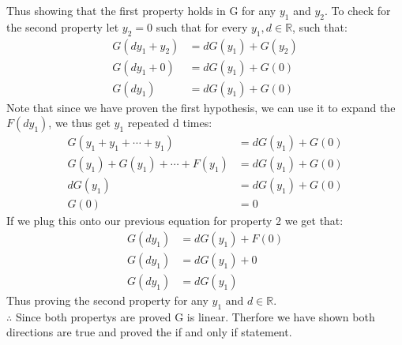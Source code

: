 \documentclass[11pt]{article}
\begin{document}
Thus showing that the first property holds in G for any $y_1$ and $y_2$. To check for the second property let $y_2 = 0$ such that for every $y_1, d \in \mathbb{R}$, such that:
\begin{align*}
G(dy_1 + y_2) &= dG(y_1) + G(y_2)\\
G(dy_1 + 0) &= dG(y_1) + G(0)\\
G(dy_1) &= dG(y_1) + G(0)
\end{align*}
Note that since we have proven the first hypothesis, we can use it to expand the $F(dy_1)$, we thus get $y_1$ repeated d times:
\begin{align*}
G(y_1 + y_1 + \cdots + y_1) &= dG(y_1) + G(0)\\
G(y_1) + G(y_1) + \cdots + F(y_1) &= dG(y_1) + G(0)\\
dG(y_1) &= dG(y_1) + G(0)\\
G(0) &= 0
\end{align*}
If we plug this onto our previous equation for property 2 we get that:
\begin{align*}
G(dy_1) &= dG(y_1) + F(0)\\
G(dy_1) &= dG(y_1) + 0\\
G(dy_1) &= dG(y_1)
\end{align*}
Thus proving the second property for any $y_1 \text{ and } d \in \mathbb{R}$.\\
$\therefore$ Since both propertys are proved G is linear. Therfore we have shown both directions are true and proved the if and only if statement.
\end{document}
